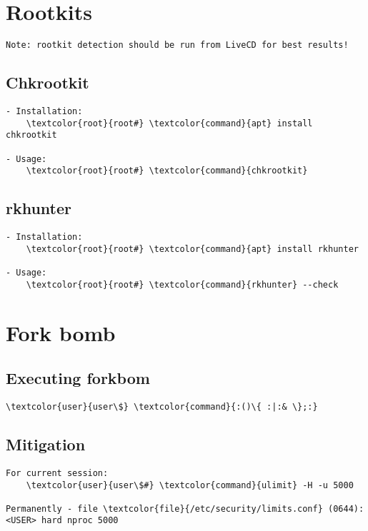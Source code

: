 \documentclass[10pt, a4paper, onecolumn, openany]{book} %
\begin{document}
\section{Rootkits}
\begin{Verbatim}[commandchars=\\\{\}]
Note: rootkit detection should be run from LiveCD for best results!
\end{Verbatim}
\subsection{Chkrootkit}
\begin{Verbatim}[commandchars=\\\{\}]
- Installation:
    \textcolor{root}{root#} \textcolor{command}{apt} install chkrootkit

- Usage:
    \textcolor{root}{root#} \textcolor{command}{chkrootkit}
\end{Verbatim}
\subsection{rkhunter}
\begin{Verbatim}[commandchars=\\\{\}]
- Installation:
    \textcolor{root}{root#} \textcolor{command}{apt} install rkhunter

- Usage:
    \textcolor{root}{root#} \textcolor{command}{rkhunter} --check
\end{Verbatim}

\section{Fork bomb}
\subsection{Executing forkbom}
\begin{Verbatim}[commandchars=\\\{\}]
    \textcolor{user}{user\$} \textcolor{command}{:()\{ :|:& \};:}
\end{Verbatim}
\subsection{Mitigation}
\begin{Verbatim}[commandchars=\\\{\}]
For current session:
    \textcolor{user}{user\$#} \textcolor{command}{ulimit} -H -u 5000

Permanently - file \textcolor{file}{/etc/security/limits.conf} (0644):
<USER> hard nproc 5000
\end{Verbatim}
\end{document}
